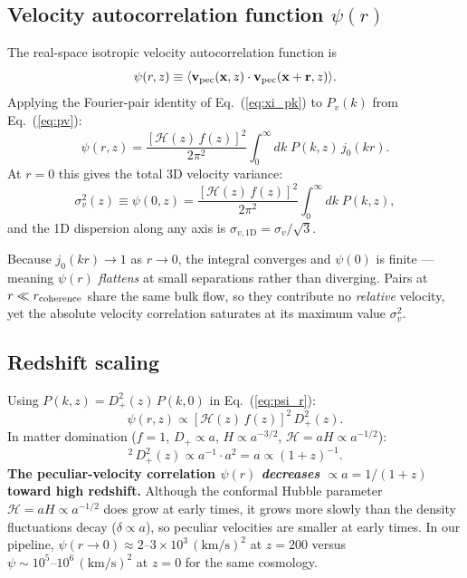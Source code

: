 \documentclass[12pt]{article}
\newcommand{\bx}{\mathbf{x}}
\newcommand{\br}{\mathbf{r}}
\newcommand{\bv}{\mathbf{v}}
\newcommand{\Dp}{D_+}
\newcommand{\calH}{\mathcal{H}}
\begin{document}
\subsection{Velocity autocorrelation function \texorpdfstring{$\psi(r)$}{psi(r)}}
\label{sec:psi}

The real-space isotropic velocity autocorrelation function is
%
\begin{equation}
  \psi(r, z)
    \equiv \langle\bv_{\rm pec}(\bx, z)\cdot\bv_{\rm pec}(\bx + \br, z)\rangle.
  \label{eq:psi_def}
\end{equation}
%
Applying the Fourier-pair identity of Eq.~(\ref{eq:xi_pk}) to
$P_v(k)$ from Eq.~(\ref{eq:pv}):
%
\begin{equation}
  \psi(r, z)
    = \frac{[\calH(z)\,f(z)]^2}{2\pi^2}
      \int_0^\infty dk\; P(k, z)\, j_0(kr).
  \label{eq:psi_r}
\end{equation}
%
At $r = 0$ this gives the total 3D velocity variance:
%
\begin{equation}
  \sigma_v^2(z) \equiv \psi(0, z)
    = \frac{[\calH(z)\,f(z)]^2}{2\pi^2}
      \int_0^\infty dk\; P(k, z),
  \label{eq:sigv}
\end{equation}
%
and the 1D dispersion along any axis is
$\sigma_{v,1\mathrm{D}} = \sigma_v/\sqrt{3}$.

Because $j_0(kr) \to 1$ as $r \to 0$, the integral
converges and $\psi(0)$ is finite --- meaning $\psi(r)$
\emph{flattens} at small separations rather than diverging.
Pairs at $r \ll r_{\rm coherence}$ share the same bulk flow, so
they contribute no \emph{relative} velocity, yet the absolute
velocity correlation saturates at its maximum value $\sigma_v^2$.

\subsection{Redshift scaling}
\label{sec:psi_z}

Using $P(k,z) = \Dp^2(z)\,P(k,0)$ in Eq.~(\ref{eq:psi_r}):
%
\begin{equation}
  \psi(r, z) \propto [\calH(z)\,f(z)]^2\,\Dp^2(z).
  \label{eq:psi_z}
\end{equation}
%
In matter domination ($f = 1$, $\Dp \propto a$, $H \propto a^{-3/2}$,
$\calH = aH \propto a^{-1/2}$):
%
\begin{equation}
  [\calH(z)]^2\,\Dp^2(z)
    \propto a^{-1} \cdot a^2 = a \propto (1+z)^{-1}.
  \label{eq:psi_z_scaling}
\end{equation}
%
\textbf{The peculiar-velocity correlation $\psi(r)$ \emph{decreases}
$\propto a = 1/(1+z)$ toward high redshift.}  Although the conformal
Hubble parameter $\calH = aH \propto a^{-1/2}$ does grow at early
times, it grows more slowly than the density fluctuations decay
($\delta \propto a$), so peculiar velocities are smaller at early
times.  In our pipeline, $\psi(r \to 0)
\approx 2\text{--}3 \times 10^3\,(\mathrm{km/s})^2$ at
$z = 200$ versus $\psi \sim 10^5\text{--}10^6\,(\mathrm{km/s})^2$ at
$z = 0$ for the same cosmology.
\end{document}
